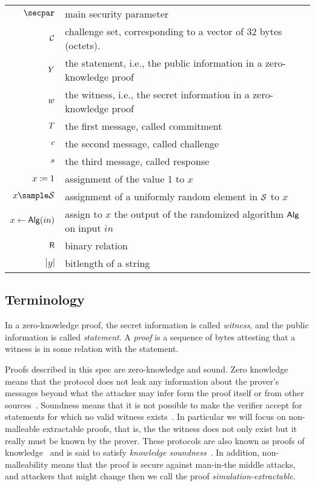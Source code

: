 \documentclass[11pt]{article}
\begin{document}
\begin{tabular}{r@{\hspace{1em}}p{13cm}}
    $\secpar$ & main security parameter\\
    $\mathcal{C}$ & challenge set, corresponding to a vector of 32 bytes (octets).\\
    $Y$ & the statement, i.e., the public information in a zero-knowledge proof \\
    $w$ & the witness, i.e., the secret information in a zero-knowledge proof \\
    $T$ & the first message, called commitment \\
    $c$ & the second message, called challenge \\
    $s$ & the third message, called response \\
    $x \coloneqq 1$ & assignment of the value 1 to $x$\\
    $x\sample\someset$ & assignment of a uniformly random element in $\mathcal{S}$ to $x$\\
    $x\gets\mathsf{Alg}(in)$ & assign to $x$ the output of the randomized algorithm $\mathsf{Alg}$ on input $in$\\
    $\mathsf{R}$ & binary relation\\
    $|y|$ & bitlength of a string
\end{tabular}

\subsection{Terminology}

In a zero-knowledge proof, the secret information is called \emph{witness},
and the public information is called \emph{statement}. A \emph{proof} is a sequence of bytes attesting that a witness is in some relation with the statement.

Proofs described in this spec are zero-knowledge and sound.
Zero knowledge means that the protocol does not leak any information about the prover's messages beyond what the attacker may infer form the proof itself or from other sources~\cite[1.6.4]{zkproof-reference}.
Soundness means that it is not possible to make the verifier accept for statements for which no valid witness exists~\cite[1.6.2]{zkproof-reference}.
In particular we will focus on non-malleable extractable proofs, that is, the the witness does not only exist but it really must be known by the prover.
These protocols are also known as proofs of knowledge~\cite{STOC:GolMicRac85,STOC:FeiFiaSha87,C:BelGol92} and is said to satisfy \emph{knowledge soundness}~\cite{damgard04}. In addition, non-malleability means that the proof is secure against man-in-the middle attacks, and attackers that might change  then we call the proof \emph{simulation-extractable}.
\end{document}

